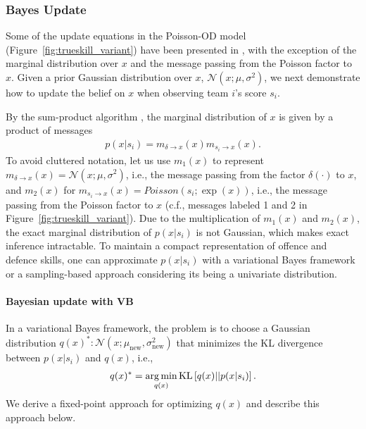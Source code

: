 \subsubsection{Bayes Update}
Some of the update equations in the Poisson-OD model
(Figure~\ref{fig:trueskill_variant}) have been presented in
\cite{herbrich06569}, with the exception of the marginal distribution
over $x$ and the message passing from the Poisson factor to $x$. Given
a prior Gaussian distribution over $x$, $\mathcal{N}(x;\mu,
\sigma^2)$, we next
demonstrate how to update the belief on $x$ when observing
team $i$'s score $s_i$.

By the sum-product algorithm \cite{kschischang01498}, the
marginal distribution of $x$ is given by a product of messages
\begin{align}\label{eq:marginal}
    p(x|s_i) = m_{\delta \rightarrow x}(x) m_{s_i \rightarrow x}(x).
\end{align}
\unindent To avoid cluttered notation, let us use $m_1(x)$ to represent
$m_{\delta \rightarrow x}(x) = \mathcal{N}(x;\mu,\sigma^2)$, i.e., the message
passing from the factor $\delta(\cdot)$ to $x$, and $m_2(x)$ for
$m_{s_i\rightarrow x}(x) = Poisson(s_i;\exp(x))$, i.e.,
the message passing from the Poisson
factor to $x$ (c.f., messages labeled 1 and 2 in
Figure~\ref{fig:trueskill_variant}). Due to the multiplication of
$m_{1}(x)$ and $m_{2}(x)$, the exact marginal distribution of
$p(x|s_i)$ is not Gaussian, which makes exact inference
intractable. To maintain a compact representation of offence and
defence skills, one can approximate $p(x|s_i)$ with a variational
Bayes framework or a sampling-based approach considering its being a univariate distribution.

\paragraph{\bf Bayesian update with VB}
In a variational Bayes framework, the problem is to choose a Gaussian distribution $q(x)^*:
\mathcal{N}(x;\mu_{\text{new}}, \sigma_{\text{new}}^2)$ that minimizes
the KL divergence between $p(x|s_i)$ and $q(x)$, i.e.,
\begin{align}\label{eq:marginal2}
    q(x)^* = \argmin_{q(x)} \text{KL}\left[q(x)|| p(x|s_i)\right].
\end{align}
We derive a fixed-point approach for optimizing $q(x)$ \cite{Beal:EMFixedPoint02} and describe this approach below.

